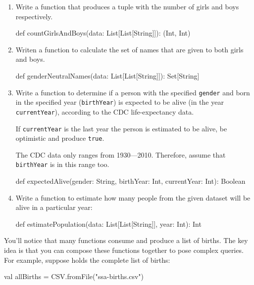 \documentclass[9pt]{extbook}
\begin{document}
\begin{enumerate}
  \item Write a function that produces a tuple with the number of girls and boys
   respectively.
  \begin{scalacode}
  def countGirlsAndBoys(data: List[List[String]]): (Int, Int)
  \end{scalacode}

  \item Writen a function to calculate the set of names that are given to both girls and boys.
  \begin{scalacode}
  def genderNeutralNames(data: List[List[String]]): Set[String]
  \end{scalacode}


  \item Write a function to determine if a person with the specified \texttt{gender} and born in the
  specified year (\texttt{birthYear}) is expected to be alive (in the year \texttt{currentYear}),
  according to the CDC life-expectancy data.

    If \texttt{currentYear} is the last year the person is estimated to be alive, be
      optimistic and produce \texttt{true}.

  The CDC data only ranges from 1930---2010. Therefore, assume that
      \texttt{birthYear} is in this range too.

  \begin{scalacode}
  def expectedAlive(gender: String, birthYear: Int, currentYear: Int): Boolean 
  \end{scalacode}

  \item Write a function to estimate how many people from the given dataset
  will be alive in a particular year:

  \begin{scalacode}
  def estimatePopulation(data: List[List[String]], year: Int): Int
  \end{scalacode}

\end{enumerate}



You'll notice that many functions
consume and produce a list of births. The key idea is that you can
compose these functions together to pose complex queries. For example,
suppose  holds the complete list of births:

\begin{scalacode}
val allBirths = CSV.fromFile("ssa-births.csv")
\end{scalacode}
\end{document}

